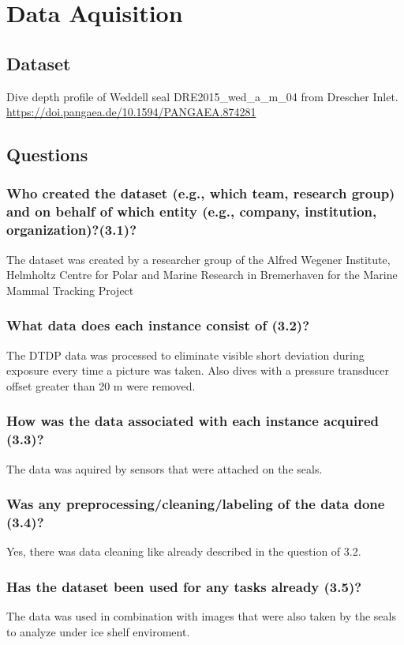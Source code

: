 \section{Data Aquisition}
\subsection{Dataset}
Dive depth profile of Weddell seal DRE2015\_wed\_a\_m\_04 from Drescher Inlet.
\url{https://doi.pangaea.de/10.1594/PANGAEA.874281}

\subsection{Questions}
\subsubsection*{Who created the dataset (e.g., which team, research group) and on behalf of which entity (e.g., company, institution, organization)?(3.1)?}
The dataset was created by a researcher group of the Alfred Wegener Institute, Helmholtz Centre for Polar and Marine Research in Bremerhaven for the Marine Mammal Tracking Project
\subsubsection*{What data does each instance consist of (3.2)?}
The DTDP data was processed to eliminate visible short deviation during exposure every time a picture was taken.
Also dives with a pressure transducer offset greater than 20 m were removed.
\subsubsection*{How was the data associated with each instance acquired (3.3)?}
The data was aquired by sensors that were attached on the seals.
\subsubsection*{Was any preprocessing/cleaning/labeling of the data done (3.4)?}
Yes, there was data cleaning like already described in the question of 3.2.
\subsubsection*{Has the dataset been used for any tasks already (3.5)?}
The data was used in combination with images that were also taken by the seals to analyze under ice shelf enviroment.
